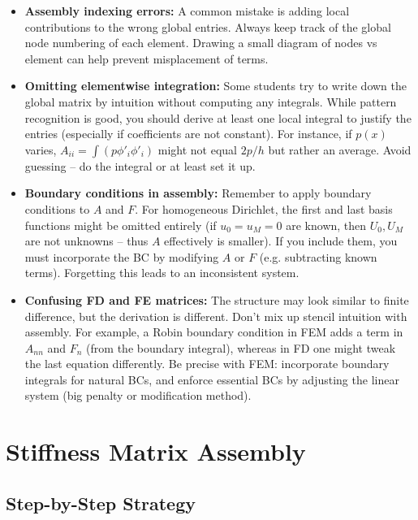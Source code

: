 \documentclass[a4paper,11pt]{report}
\begin{document}
\begin{pitfalls}{}{}
    \begin{itemize}
        \item \textbf{Assembly indexing errors:} A common mistake is adding local contributions to the wrong global entries. Always keep track of the global node numbering of each element. Drawing a small diagram of nodes vs element can help prevent misplacement of terms.
        \item \textbf{Omitting elementwise integration:} Some students try to write down the global matrix by intuition without computing any integrals. While pattern recognition is good, you should derive at least one local integral to justify the entries (especially if coefficients are not constant). For instance, if $p(x)$ varies, $A_{ii} = \int (p\phi'_i\phi'_i)$ might not equal $2p/h$ but rather an average. Avoid guessing -- do the integral or at least set it up.
        \item \textbf{Boundary conditions in assembly:} Remember to apply boundary conditions to $A$ and $F$. For homogeneous Dirichlet, the first and last basis functions might be omitted entirely (if $u_0=u_M=0$ are known, then $U_0,U_M$ are not unknowns -- thus $A$ effectively is smaller). If you include them, you must incorporate the BC by modifying $A$ or $F$ (e.g. subtracting known terms). Forgetting this leads to an inconsistent system.
        \item \textbf{Confusing FD and FE matrices:} The structure may look similar to finite difference, but the derivation is different. Don't mix up stencil intuition with assembly. For example, a Robin boundary condition in FEM adds a term in $A_{nn}$ and $F_n$ (from the boundary integral), whereas in FD one might tweak the last equation differently. Be precise with FEM: incorporate boundary integrals for natural BCs, and enforce essential BCs by adjusting the linear system (big penalty or modification method).
    \end{itemize}
\end{pitfalls}
\clearpage

\section{Stiffness Matrix Assembly}

\subsection{Step-by-Step Strategy}
\end{document}
